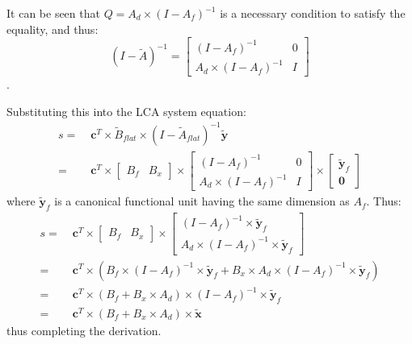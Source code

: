 It can be seen that $Q=A_d\times(I-A_f)^{-1}$ is a necessary condition to satisfy the equality, and thus:
\begin{equation}
  (I-\tilde{A})^{-1} = \left[\begin{array}{cc} (I-A_f)^{-1} & 0 \\ A_d\times(I-A_f)^{-1} & I\end{array}\right]
\end{equation}.

Substituting this into the LCA system equation:
\begin{align}
  s =\;& \mathbf{c}^T\times \tilde{B}_{flat}\times(I-\tilde{A}_{flat})^{-1}\tilde{\mathbf{y}}\\
  =\;& \mathbf{c}^T\times \left[\begin{array}{cc} B_f & B_x \end{array}\right]\times
  \left[\begin{array}{cc} (I-A_f)^{-1} & 0 \\ A_d\times(I-A_f)^{-1} & I \end{array}\right]
  \times\left[\begin{array}{c} \tilde{\mathbf{y}}_f \\ \mathbf{0}\end{array}\right]
\end{align}
where $\tilde{\mathbf{y}}_f$ is a canonical functional unit having the same dimension as $A_f$.  Thus:
\begin{align}
s =\;& \mathbf{c}^T\times \left[\begin{array}{cc} B_f & B_x \end{array}\right]\times
 \left[\begin{array}{c} (I-A_f)^{-1}\times\tilde{\mathbf{y}}_f \\ A_d\times(I-A_f)^{-1}\times\tilde{\mathbf{y}}_f\end{array}\right]\\
 =\;& \mathbf{c}^T\times \left(B_f\times(I-A_f)^{-1}\times\tilde{\mathbf{y}}_f
 + B_x\times A_d\times(I-A_f)^{-1}\times\tilde{\mathbf{y}}_f\right)\\
 =\;& \mathbf{c}^T\times \left(B_f + B_x\times A_d\right)\times(I-A_f)^{-1}\times \tilde{\mathbf{y}}_f\\
 =\;& \mathbf{c}^T\times \left(B_f + B_x\times A_d\right)\times \tilde{\mathbf{x}}
\end{align}
thus completing the derivation.
